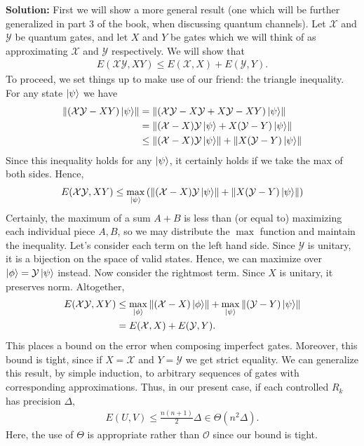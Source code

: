 \documentclass{book}
\newcommand{\mc}[1]{\mathcal{#1}}
\begin{document}
    \textbf{Solution:} First we will show a more general result (one which will be further generalized in part 3 of the book, when discussing quantum channels). Let $\mc{X}$ and $\mc{Y}$ be quantum gates, and let $X$ and $Y$ be gates which we will think of as approximating $\mc{X}$ and $\mc{Y}$ respectively. We will show that
    \begin{align}
        E(\mc{XY},XY) \leq E(\mc{X},X) + E(\mc{Y},Y).
    \end{align}
    To proceed, we set things up to make use of our friend: the triangle inequality. For any state $\ket{\psi}$ we have
    \begin{align}
        \left\|(\mc{XY}-XY)\ket{\psi}\right\|&=\left\|(\mc{X}\mc{Y}-X\mc{Y}+X\mc{Y}-XY)\ket{\psi}\right\| \\
        &= \left\|(\mc{X}-X)\mc{Y}\ket{\psi}+X(\mc{Y}-Y)\ket{\psi}\right\| \\
        &\leq \left\|(\mc{X}-X)\mc{Y}\ket{\psi}\right\|+\left\|X(\mc{Y}-Y)\ket{\psi}\right\|
    \end{align}
    Since this inequality holds for any $\ket{\psi}$, it certainly holds if we take the max of both sides. Hence,
    \begin{align}
        E(\mc{XY},XY) \leq \max_{\ket{\psi}} \left(\left\|(\mc{X}-X)\mc{Y}\ket{\psi}\right\|+\left\|X(\mc{Y}-Y)\ket{\psi}\right\|\right)
    \end{align}
    Certainly, the maximum of a sum $A+B$ is less than (or equal to) maximizing each individual piece $A,B$, so we may distribute the $\max$ function and maintain the inequality. Let's consider each term on the left hand side. Since $\mc{Y}$ is unitary, it is a bijection on the space of valid states. Hence, we can maximize over $\ket{\phi} = \mc{Y}\ket{\psi}$ instead. Now consider the rightmost term. Since $X$ is unitary, it preserves norm. Altogether,
    \begin{align}
         E(\mc{XY},XY) &\leq \max_{\ket{\phi}}\left\|(\mc{X}-X)\ket{\phi}\right\| + \max_{\ket{\psi}}\left\|(\mc{Y}-Y)\ket{\psi}\right\|\\
         &= E(\mc{X},X) + E(\mc{Y},Y).
    \end{align}
    This places a bound on the error when composing imperfect gates. Moreover, this bound is tight, since if $X=\mc{X}$ and $Y=\mc{Y}$ we get strict equality. 
    We can generalize this result, by simple induction, to arbitrary sequences of gates with corresponding approximations. Thus, in our present case, if each controlled $R_k$ has precision $\Delta$, 
    \begin{align}
        E(U,V) \leq \frac{n(n+1)}{2}\Delta \in \Theta(n^2 \Delta).
    \end{align}
    Here, the use of $\Theta$ is appropriate rather than $\mc{O}$ since our bound is tight.
\end{document}
